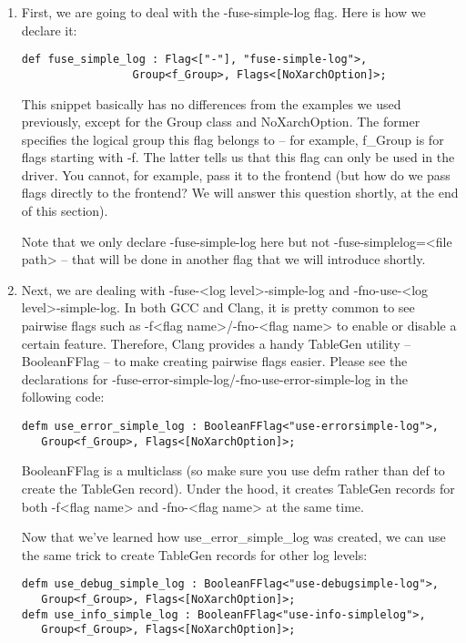 \begin{enumerate}
\item First, we are going to deal with the -fuse-simple-log flag. Here is how we declare it:

\begin{lstlisting}[style=styleJavaScript]
def fuse_simple_log : Flag<["-"], "fuse-simple-log">,
                 Group<f_Group>, Flags<[NoXarchOption]>;
\end{lstlisting}

This snippet basically has no differences from the examples we used previously, except for the Group class and NoXarchOption. The former specifies the logical group this flag belongs to – for example, f\_Group is for flags starting with -f. The latter tells us that this flag can only be used in the driver. You cannot, for example, pass it to the frontend (but how do we pass flags directly to the frontend? We will answer this question shortly, at the end of this section).

Note that we only declare -fuse-simple-log here but not -fuse-simplelog=<file path> – that will be done in another flag that we will introduce shortly.

\item Next, we are dealing with -fuse-<log level>-simple-log and -fno-use-<log level>-simple-log. In both GCC and Clang, it is pretty common to see pairwise flags such as -f<flag name>/-fno-<flag name> to enable or disable a certain feature. Therefore, Clang provides a handy TableGen utility – BooleanFFlag – to make creating pairwise flags easier. Please see the declarations for -fuse-error-simple-log/-fno-use-error-simple-log in the following code:

\begin{lstlisting}[style=styleJavaScript]
defm use_error_simple_log : BooleanFFlag<"use-errorsimple-log">,
   Group<f_Group>, Flags<[NoXarchOption]>;
\end{lstlisting}

BooleanFFlag is a multiclass (so make sure you use defm rather than def to create the TableGen record). Under the hood, it creates TableGen records for both -f<flag name> and -fno-<flag name> at the same time.

Now that we've learned how use\_error\_simple\_log was created, we can use the same trick to create TableGen records for other log levels:

\begin{lstlisting}[style=styleJavaScript]
defm use_debug_simple_log : BooleanFFlag<"use-debugsimple-log">, 
   Group<f_Group>, Flags<[NoXarchOption]>;
defm use_info_simple_log : BooleanFFlag<"use-info-simplelog">, 
   Group<f_Group>, Flags<[NoXarchOption]>;
\end{lstlisting}


\end{enumerate}
